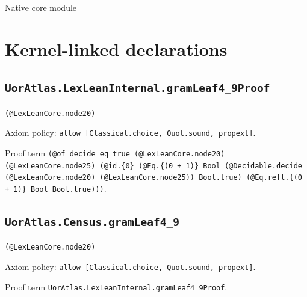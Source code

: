\documentclass[11pt]{article}
\begin{document}
\begin{center}{\LARGE Native core module}\end{center}
\section*{Kernel-linked declarations}
\subsection*{\texttt{UorAtlas.LexLeanInternal.gramLeaf4\_9Proof}}
\noindent\texttt{(@LexLeanCore.node20)}\par
\noindent Axiom policy: \texttt{allow [Classical.choice, Quot.sound, propext]}.\par
\noindent Proof term \texttt{(@of\_decide\_eq\_true (@LexLeanCore.node20) (@LexLeanCore.node25) (@id.\{0\} (@Eq.\{(0 + 1)\} Bool (@Decidable.decide (@LexLeanCore.node20) (@LexLeanCore.node25)) Bool.true) (@Eq.refl.\{(0 + 1)\} Bool Bool.true)))}.\par
\subsection*{\texttt{UorAtlas.Census.gramLeaf4\_9}}
\noindent\texttt{(@LexLeanCore.node20)}\par
\noindent Axiom policy: \texttt{allow [Classical.choice, Quot.sound, propext]}.\par
\noindent Proof term \texttt{UorAtlas.LexLeanInternal.gramLeaf4\_9Proof}.\par
\end{document}
